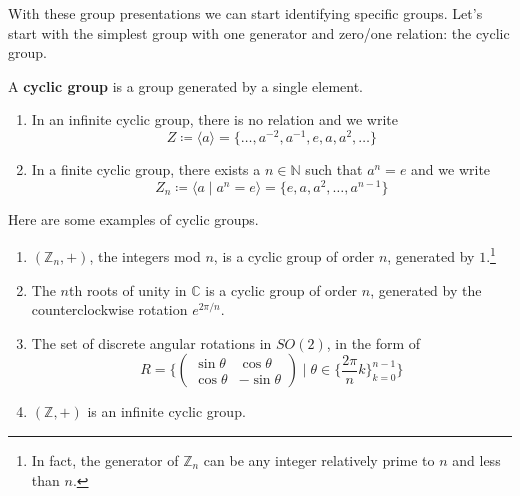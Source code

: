   With these group presentations we can start identifying specific groups. Let's start with the simplest group with one generator and zero/one relation: the cyclic group. 

  \begin{definition}
    A \textbf{cyclic group} is a group generated by a single element. 
    \begin{enumerate}
      \item In an infinite cyclic group, there is no relation and we write 
      \begin{equation}
        Z \coloneqq \langle a \rangle = \{ \ldots, a^{-2}, a^{-1}, e, a, a^2, \ldots \}
      \end{equation}

      \item In a finite cyclic group, there exists a $n \in \mathbb{N}$ such that $a^{n} = e$ and we write 
      \begin{equation}
        Z_n \coloneqq \langle a \mid a^n = e \rangle = \{e, a, a^2, \ldots, a^{n-1} \}
      \end{equation}
    \end{enumerate}
  \end{definition} 
  
  \begin{example} 
    Here are some examples of cyclic groups. 
    \begin{enumerate}
      \item $(\mathbb{Z}_n, +)$, the integers mod $n$, is a cyclic group of order $n$, generated by $1$.\footnote{In fact, the generator of $\mathbb{Z}_n$ can be any integer relatively prime to $n$ and less than $n$.} 
      \item The $n$th roots of unity in $\mathbb{C}$ is a cyclic group of order $n$, generated by the counterclockwise rotation $e^{2\pi/n}$. 
      \item The set of discrete angular rotations in $SO(2)$, in the form of 
      \begin{equation}
        R =  \bigg\{ \begin{pmatrix}
        \sin{\theta} & \cos{\theta} \\
        \cos{\theta} & -\sin{\theta}
        \end{pmatrix}\; \bigg| \; \theta \in \Big\{\frac{2 \pi}{n} k\Big\}_{k = 0}^{n-1} \bigg\}
      \end{equation}

      \item $(\mathbb{Z}, +)$ is an infinite cyclic group. 
    \end{enumerate}
  \end{example}

